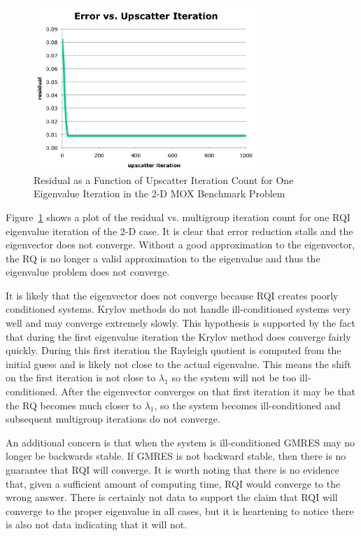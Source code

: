 \begin{figure}[!ht]	
  \begin{center}
    \includegraphics [width=0.75\textwidth, height=0.4\textheight ] {RQIConvergenceFail}
  \end{center}
  \caption{Residual as a Function of Upscatter Iteration Count for One Eigenvalue Iteration in the 2-D MOX Benchmark Problem}
  \label{fig:RQIConvergenceFail}
\end{figure}
%
Figure~\ref{fig:RQIConvergenceFail} shows a plot of the residual vs. multigroup iteration count for one RQI eigenvalue iteration of the 2-D case. It is clear that error reduction stalls and the eigenvector does not converge. Without a good approximation to the eigenvector, the RQ is no longer a valid approximation to the eigenvalue and thus the eigenvalue problem does not converge.

It is likely that the eigenvector does not converge because RQI creates poorly conditioned systems. Krylov methods do not handle ill-conditioned systems very well and may converge extremely slowly. This hypothesis is supported by the fact that during the first eigenvalue iteration the Krylov method does converge fairly quickly. During this first iteration the Rayleigh quotient is computed from the initial guess and is likely not close to the actual eigenvalue. This means the shift on the first iteration is not close to $\lambda_{1}$ so the system will not be too ill-conditioned. After the eigenvector converges on that first iteration it may be that the RQ becomes much closer to $\lambda_{1}$, so the system becomes ill-conditioned and subsequent multigroup iterations do not converge. 

An additional concern is that when the system is ill-conditioned GMRES may no longer be backwards stable. If GMRES is not backward stable, then there is no guarantee that RQI will converge. It is worth noting that there is no evidence that, given a sufficient amount of computing time, RQI would converge to the wrong answer. There is certainly not data to support the claim that RQI will converge to the proper eigenvalue in all cases, but it is heartening to notice there is also not data indicating that it will not. 

